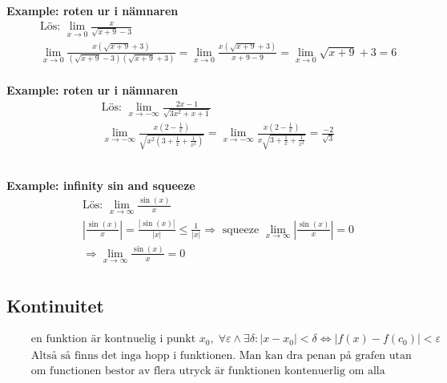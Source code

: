 \documentclass{article}
\begin{document}
\textbf{Example: roten ur i nämnaren}
\begin{align*}
  &\quad  \text{Lös: } \lim_{x\to 0} \frac{x}{\sqrt{x+9}-3}  \\
  &\quad  \lim_{x\to 0} \frac{x(\sqrt{x+9}+3)}{(\sqrt{x+9}-3)(\sqrt{x+9}+3)} =
  \lim_{x\to 0} \frac{x(\sqrt{x+9}+3)}{x+9-9} = \lim_{x\to 0} \sqrt{x+9}+3 = 6   \\
\end{align*}

\textbf{Example: roten ur i nämnaren}
\begin{align*}
  &\quad  \text{Lös: } \lim_{x\to-\infty} \frac{2x-1}{\sqrt{3x^2+x+1}}  \\
  &\quad  \lim_{x\to-\infty} \frac{x(2-\frac{1}{x})}{\sqrt{x^2(3+\frac{1}{x}+\frac{1}{x^2})}} =
  \lim_{x\to-\infty} \frac{x(2-\frac{1}{x})}{x\sqrt{3+\frac{1}{x}+\frac{1}{x^2}}} = \frac{-2}{\sqrt{3}} \\
  &\quad   \\
  &\quad   \\
\end{align*}

\textbf{Example: infinity sin and squeeze}
\begin{align*}
  &\quad  \text{Lös: } \lim_{x\to\infty}\frac{\sin(x)}{x}  \\
  &\quad  |\frac{\sin(x)}{x}| = \frac{|\sin(x)|}{|x|} \leq \frac{1}{|x|} \Rightarrow \text{ squeeze }
  \lim_{x\to\infty}|\frac{\sin(x)}{x}| = 0  \\
  &\quad  \Rightarrow \lim_{x\to\infty}\frac{\sin(x)}{x} = 0  \\
\end{align*}


\subsection{Kontinuitet}
\begin{align*}
  &\quad  \text{en funktion är kontnuelig i punkt } x_0, \; \forall \varepsilon \land \exists \delta: |x-x_0| < \delta \Leftrightarrow |f(x)-f(c_0)|<\varepsilon \\
  &\quad  \text{Altså så finns det inga hopp i funktionen. Man kan dra penan på grafen utan att släppa} \\
  &\quad  \text{om functionen bestor av flera utryck är funktionen kontenuerlig om alla utrycken är det } \\
\end{align*}


\newpage
\end{document}
